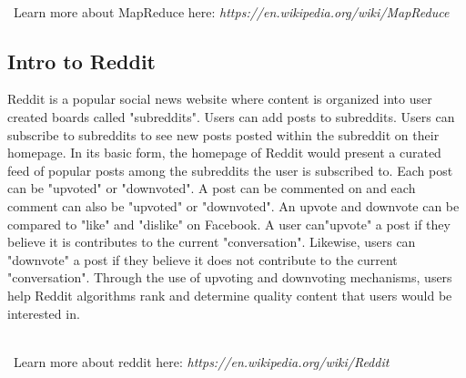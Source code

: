 \documentclass{article}
\begin{document}
\-\\\ \noindent Learn more about MapReduce here: \textit{https://en.wikipedia.org/wiki/MapReduce}


%

\subsection*{Intro to Reddit}
Reddit is a popular social news website where content is organized into user created boards called "subreddits". Users can add posts to subreddits.  Users can subscribe to subreddits to see new posts posted within the subreddit on their homepage. In its basic form, the homepage of Reddit would present a curated feed of popular posts among the subreddits the user is subscribed to. Each post can be "upvoted" or "downvoted". A post can be commented on and each comment can also be "upvoted" or "downvoted". An upvote and downvote can be compared to "like" and "dislike" on Facebook. A user can"upvote" a post if they believe it is contributes to the current "conversation". Likewise, users can "downvote" a post if they believe it does not contribute to the current "conversation". Through the use of upvoting and downvoting mechanisms, users help Reddit algorithms rank and determine quality content that users would be interested in.

\-\\\ \noindent Learn more about reddit here: \textit{https://en.wikipedia.org/wiki/Reddit}
\end{document}
